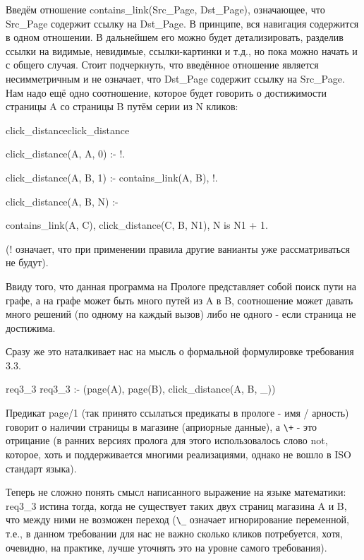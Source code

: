 \documentclass[a4paper]{book}
\def\td{т.\thinspace д.}
\def\te{т.\thinspace е.}
\begin{document}
Введём отношение contains\_link(Src\_Page, Dst\_Page),
означающее, что Src\_Page содержит ссылку на Dst\_Page. В
принципе, вся навигация содержится в одном отношении. В
дальнейшем его можно будет детализировать, разделив ссылки на
видимые, невидимые, ссылки-картинки и \td, но пока можно начать
и с общего случая. Стоит подчеркнуть, что введённое отношение
является несимметричным и не означает, что Dst\_Page содержит
ссылку на Src\_Page. Нам надо ещё одно соотношение, которое будет
говорить о достижимости страницы A со страницы B путём серии из N
кликов:

\begin{example}{click\_distance}{click_distance}

click_distance(A, A, 0) :- !.

click_distance(A, B, 1) :- contains_link(A, B), !.

click_distance(A, B, N) :-

                  contains_link(A, C),
                  click_distance(C, B, N1),
                  N is N1 + 1.
\end{example}

(! означает, что при применении правила другие ванианты уже
рассматриваться не будут).

Ввиду того, что данная программа на Прологе представляет собой
поиск пути на графе, а на графе может быть много путей из A в B,
соотношение может давать много решений (по одному на каждый
вызов) либо не одного - если страница не достижима.

Сразу же это наталкивает нас на мысль о формальной формулировке
требования 3.3.

\begin{example}{req3\_3}{}
req3_3 :- \+ (page(A), page(B), \+ click_distance(A, B, _))
\end{example}

Предикат page/1 (так принято ссылаться предикаты в прологе - имя
/ арность) говорит о наличии страницы в магазине (априорные
данные), а \verb|\+| - это отрицание (в ранних версиях пролога
для этого использовалось слово not, которое, хоть и
поддерживается многими реализациями, однако не вошло в ISO
стандарт языка).

Теперь не сложно понять смысл написанного выражение на языке
математики: req3\_3 истина тогда, когда не существует таких двух
страниц магазина A и B, что между ними не возможен переход
(\verb|\_| означает игнорирование переменной, \te, в данном
требовании для нас не важно сколько кликов потребуется, хотя,
очевидно, на практике, лучше уточнять это на уровне самого
требования).
\end{document}
